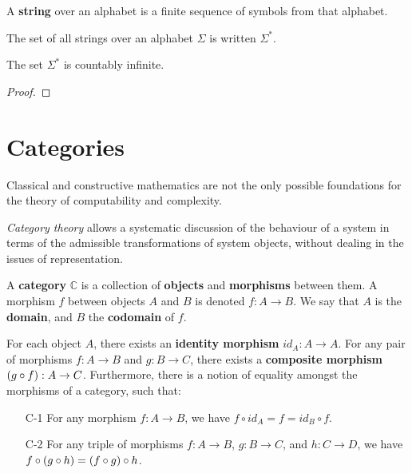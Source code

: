 \begin{definition} A \textbf{string} over an alphabet is a finite sequence of
symbols from that alphabet. \end{definition}

\begin{definition} The set of all strings over an alphabet $\Sigma$ is written
$\Sigma^*$. \end{definition}

\begin{theorem} \label{thm:kleene-star-countably-infinite} The set $\Sigma^*$
is countably infinite. \end{theorem}

\begin{proof} \end{proof}

\section{Categories}

Classical and constructive mathematics are not the only possible foundations
for the theory of computability and complexity.

\emph{Category theory} allows a systematic discussion of the behaviour of a
system in terms of the admissible transformations of system objects, without
dealing in the issues of representation.

\begin{specification} A \textbf{category} $\mathbb{C}$ is a collection of
\textbf{objects} and \textbf{morphisms} between them. A morphism $f$ between
objects $A$ and $B$ is denoted $f:A\rightarrow B$. We say that $A$ is the
\textbf{domain}, and $B$ the \textbf{codomain} of $f$.

For each object $A$, there exists an \textbf{identity morphism}
$id_A:A\rightarrow A$. For any pair of morphisms $f : A\rightarrow B$ and $g :
B \rightarrow C$, there exists a \textbf{composite morphism} $\mathopen{}\left({g\circ f}\right)\mathclose{} : A
\rightarrow C$.  Furthermore, there is a notion of equality amongst the
morphisms of a category, such that:

\begin{enumerate}

\item [C-1] For any morphism $f:A\rightarrow B$, we have $f\circ id_A = f =
id_B \circ f$.

\item [C-2] For any triple of morphisms $f : A \rightarrow B$, $g : B
\rightarrow C$, and $h : C \rightarrow D$, we have $f\circ \mathopen{}\left({g \circ h}\right)\mathclose{} =
\mathopen{}\left({f\circ g}\right)\mathclose{} \circ h$.

\end{enumerate}

\end{specification}


